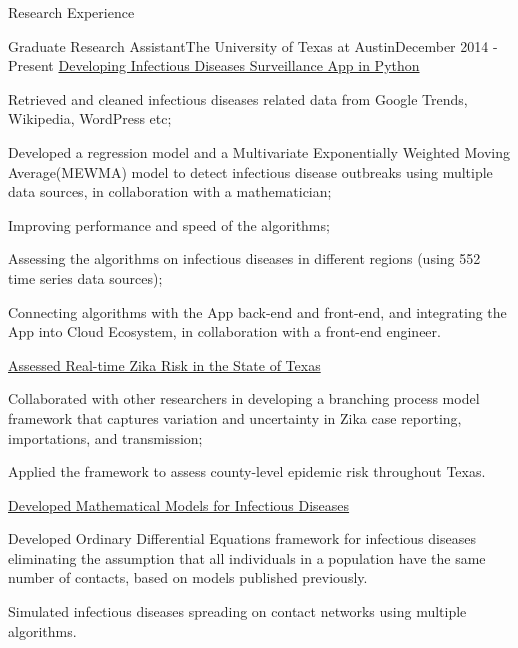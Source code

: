\documentclass{my_resume} %
\begin{document}

\begin{rSection}{Research Experience}

\begin{rSubsection}{Graduate Research Assistant}{The
    University of Texas at Austin}{December 2014 - Present}
  \underline{Developing Infectious Diseases Surveillance App in Python}
  \item Retrieved and cleaned infectious diseases related data from Google
    Trends, Wikipedia, WordPress etc;
  \item Developed a regression model and a Multivariate Exponentially Weighted
    Moving Average(MEWMA) model to detect infectious disease outbreaks using
    multiple data sources, in collaboration with a mathematician;
  \item Improving performance and speed of the algorithms;
  \item Assessing the algorithms on infectious diseases in different regions
    (using 552 time series data sources);
  \item Connecting algorithms with the App back-end and front-end, and
    integrating the App into Cloud Ecosystem, in collaboration with a front-end
    engineer.

  \underline{Assessed Real-time Zika Risk in the State of Texas}
  \item Collaborated with other researchers in developing a branching process
    model framework that captures variation and uncertainty in Zika case
    reporting, importations, and transmission;
  \item Applied the framework to assess county-level epidemic risk throughout
    Texas.

  \underline{Developed Mathematical Models for Infectious Diseases}
  \item Developed Ordinary Differential Equations framework for infectious diseases
    eliminating the assumption that all individuals in a population have the
    same number of contacts, based on models published previously.
  \item Simulated infectious diseases spreading on contact networks using
    multiple algorithms.
\end{rSubsection}
\end{rSection}
\end{document}
